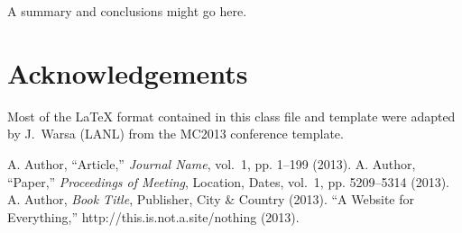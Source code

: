 \documentclass{ictt25}
\begin{document}

A summary and conclusions might go here.

\section*{Acknowledgements}

Most of the {\LaTeX} format contained in this class file and template
were adapted by J.~Warsa (LANL) from the MC2013 conference template.


\setlength{\baselineskip}{12pt}
\begin{thebibliography}{300}
 A. Author, ``Article,'' {\it Journal Name}, vol.~1, pp. 1--199 (2013).
 A. Author, ``Paper,'' {\it Proceedings of Meeting}, Location, Dates, vol.~1, pp. 5209--5314 (2013).
 A. Author, {\it Book Title}, Publisher, City \& Country (2013). 
 ``A Website for Everything,'' http://this.is.not.a.site/nothing (2013).
\end{thebibliography}
\end{document}
